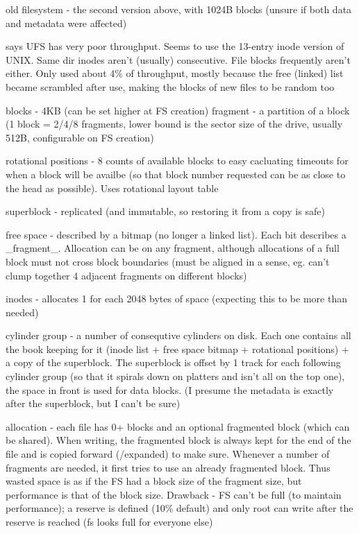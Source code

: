\documentclass[a4paper]{report}
\begin{document}
        old filesystem - the second version above, with 1024B blocks (unsure if
        both data and metadata were affected)

        says UFS has very poor throughput. Seems to use the 13-entry inode
        version of UNIX. Same dir inodes aren't (usually) consecutive. File
        blocks frequently aren't either. Only used about 4\% of throughput,
        mostly because the free (linked) list became scrambled after use,
        making the blocks of new files to be random too

        blocks - 4KB (can be set higher at FS creation)
        fragment - a partition of a block (1 block = 2/4/8 fragments, lower
        bound is the sector size of the drive, usually 512B, configurable on FS
        creation)

        rotational positions - 8 counts of available blocks to easy cacluating
        timeouts for when a block will be availbe (so that block number
        requested can be as close to the head as possible). Uses rotational
        layout table

        superblock - replicated (and immutable, so restoring it from a copy is safe)

        free space - described by a bitmap (no longer a linked list). Each bit
        describes a \_fragment\_. Allocation can be on any fragment, although
        allocations of a full block must not cross block boundaries (must be
        aligned in a sense, eg. can't clump together 4 adjacent fragments on
        different blocks)

        inodes - allocates 1 for each 2048 bytes of space (expecting this to be
        more than needed)

        cylinder group - a number of consequtive cylinders on disk. Each one
        contains all the book keeping for it (inode list + free space bitmap +
        rotational positions) + a copy of the superblock. The superblock is
        offset by 1 track for each following cylinder group (so that it spirals
        down on platters and isn't all on the top one), the space in front is
        used for data blocks. (I presume the metadata is exactly after the
        superblock, but I can't be sure)

        allocation - each file has 0+ blocks and an optional fragmented block
        (which can be shared). When writing, the fragmented block is always
        kept for the end of the file and is copied forward (/expanded) to make
        sure. Whenever a number of fragments are needed, it first tries to use
        an already fragmented block. Thus wasted space is as if the FS had a
        block size of the fragment size, but performance is that of the block
        size. Drawback - FS can't be full (to maintain performance); a reserve
        is defined (10\% default) and only root can write after the reserve is
        reached (fs looks full for everyone else)
\end{document}
